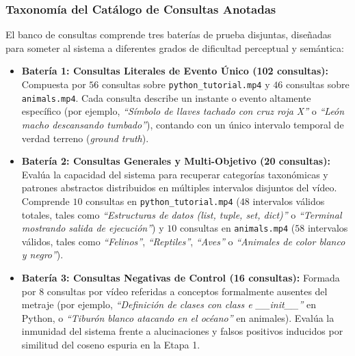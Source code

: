 \subsubsection{Taxonomía del Catálogo de Consultas Anotadas}
El banco de consultas comprende tres baterías de prueba disjuntas, diseñadas para someter al sistema a diferentes grados de dificultad perceptual y semántica:
\begin{itemize}
    \item \textbf{Batería 1: Consultas Literales de Evento Único (102 consultas):} Compuesta por $56$ consultas sobre \texttt{python\_tutorial.mp4} y $46$ consultas sobre \texttt{animals.mp4}. Cada consulta describe un instante o evento altamente específico (por ejemplo, \textit{``Símbolo de llaves tachado con cruz roja X''} o \textit{``León macho descansando tumbado''}), contando con un único intervalo temporal de verdad terreno (\textit{ground truth}).
    \item \textbf{Batería 2: Consultas Generales y Multi-Objetivo (20 consultas):} Evalúa la capacidad del sistema para recuperar categorías taxonómicas y patrones abstractos distribuidos en múltiples intervalos disjuntos del vídeo. Comprende $10$ consultas en \texttt{python\_tutorial.mp4} ($48$ intervalos válidos totales, tales como \textit{``Estructuras de datos (list, tuple, set, dict)''} o \textit{``Terminal mostrando salida de ejecución''}) y $10$ consultas en \texttt{animals.mp4} ($58$ intervalos válidos, tales como \textit{``Felinos''}, \textit{``Reptiles''}, \textit{``Aves''} o \textit{``Animales de color blanco y negro''}).
    \item \textbf{Batería 3: Consultas Negativas de Control (16 consultas):} Formada por $8$ consultas por vídeo referidas a conceptos formalmente ausentes del metraje (por ejemplo, \textit{``Definición de clases con class e \_\_init\_\_''} en Python, o \textit{``Tiburón blanco atacando en el océano''} en animales). Evalúa la inmunidad del sistema frente a alucinaciones y falsos positivos inducidos por similitud del coseno espuria en la Etapa 1.
\end{itemize}

